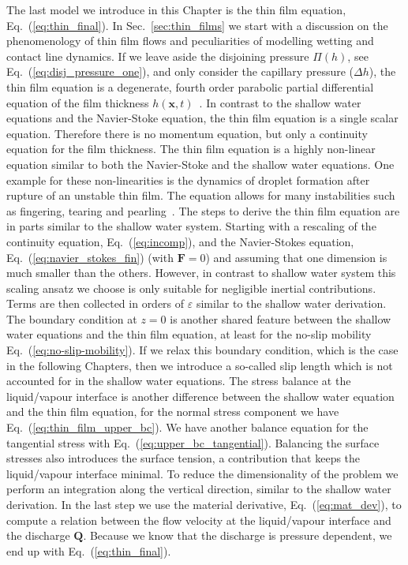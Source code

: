 The last model we introduce in this Chapter is the thin film equation, Eq.~(\ref{eq:thin_final}). 
In Sec.~\ref{sec:thin_films} we start with a discussion on the phenomenology of thin film flows and peculiarities of modelling wetting and contact line dynamics.
If we leave aside the disjoining pressure $\Pi(h)$, see Eq.~(\ref{eq:disj_pressure_one}), and only consider the capillary pressure ($\Delta h$), the thin film equation is a degenerate, fourth order parabolic partial differential equation of the film thickness $h(\mathbf{x},t)$~\cite{peschkaVariationalApproachDynamic2018}.
In contrast to the shallow water equations and the Navier-Stoke equation, the thin film equation is a single scalar equation.
Therefore there is no momentum equation, but only a continuity equation for the film thickness.
The thin film equation is a highly non-linear equation similar to both the Navier-Stoke and the shallow water equations. 
One example for these non-linearities is the dynamics of droplet formation after rupture of an unstable thin film. 
The equation allows for many instabilities such as fingering, tearing and pearling~\cite{crasterDynamicsStabilityThin2009, wilczekSlidingDropsEnsemble2017}. 
The steps to derive the thin film equation are in parts similar to the shallow water system.
Starting with a rescaling of the continuity equation, Eq.~(\ref{eq:incomp}), and the Navier-Stokes equation, Eq.~(\ref{eq:navier_stokes_fin}) (with $\mathbf{F} = 0$) and assuming that one dimension is much smaller than the others. 
However, in contrast to shallow water system this scaling ansatz we choose is only suitable for negligible inertial contributions.
Terms are then collected in orders of $\varepsilon$ similar to the shallow water derivation.
The boundary condition at $z=0$ is another shared feature between the shallow water equations and the thin film equation, at least for the no-slip mobility Eq.~(\ref{eq:no-slip-mobility}).
If we relax this boundary condition, which is the case in the following Chapters, then we introduce a so-called slip length which is not accounted for in the shallow water equations.
The stress balance at the liquid/vapour interface is another difference between the shallow water equation and the thin film equation, for the normal stress component we have Eq.~(\ref{eq:thin_film_upper_bc}).
We have another balance equation for the tangential stress with Eq.~(\ref{eq:upper_bc_tangential}).
Balancing the surface stresses also introduces the surface tension, a contribution that keeps the liquid/vapour interface minimal.  
To reduce the dimensionality of the problem we perform an integration along the vertical direction, similar to the shallow water derivation.
In the last step we use the material derivative, Eq.~(\ref{eq:mat_dev}), to compute a relation between the flow velocity at the liquid/vapour interface and the discharge $\mathbf{Q}$.
Because we know that the discharge is pressure dependent, we end up with Eq.~(\ref{eq:thin_final}).

